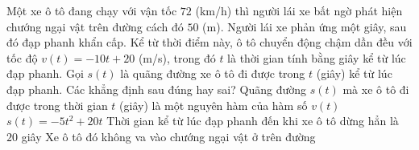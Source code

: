 \begin{ex}%
	Một xe ô tô đang chạy với vận tốc $72$  (km/h) thì người lái xe bất ngờ phát hiện chướng ngại vật trên đường cách đó $50$ (m). Người lái xe phản ứng một giây, sau đó đạp phanh khẩn cấp. Kể từ thời điểm này, ô tô chuyển động chậm dần đều với tốc độ $v(t) = -10t + 20$ (m/s), trong đó $t$ là thời gian tính bằng giây kể từ lúc đạp phanh. Gọi $s(t)$ là quãng đường xe ô tô đi được trong $t$ (giây) kể từ lúc đạp phanh. Các khẳng định sau đúng hay sai?
	\choiceTF 
		{\True Quãng đường $s(t)$ mà xe ô tô đi được trong  thời gian $t$ (giây) là một nguyên hàm của hàm số $v(t)$}
		{\True $s(t) = -5t^2 + 20t$} 
		{Thời gian  kể từ lúc đạp phanh đến khi xe ô tô dừng hẳn là $20$ giây}
		{\True Xe ô tô đó  không va vào chướng ngại vật ở trên đường}
\end{ex}

